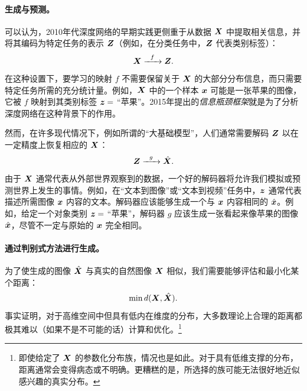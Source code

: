 \documentclass[../../book-main.tex]{subfiles}
\begin{document}
\paragraph{生成与预测。}
可以认为，2010年代深度网络的早期实践更侧重于从数据 $\bm{X}$ 中提取相关信息，并将其编码为特定任务的表示 $\bm{Z}$（例如，在分类任务中，$\bm{Z}$ 代表类别标签）：
\begin{equation}
    \bm{X}   \xrightarrow{\hspace{2mm} f \hspace{2mm}} \bm{Z}.
       \label{eqn:encoding-deep-networks}
\end{equation}
在这种设置下，要学习的映射 $f$ 不需要保留关于 $\bm{X}$ 的大部分分布信息，而只需要特定任务所需的充分统计量。例如，$\bm{X}$ 中的一个样本 $\bm{x}$ 可能是一张苹果的图像，它被 $f$ 映射到其类别标签 $\bm{z} =$ “苹果”。2015年提出的{\em 信息瓶颈框架}\cite{Tishby-ITW2015}就是为了分析深度网络在这种背景下的作用。
 
然而，在许多现代情况下，例如所谓的“大基础模型”，人们通常需要解码 $\bm{Z}$ 以在一定精度上恢复相应的 $\bm{X}$：
\begin{equation}
    \bm{Z}   \xrightarrow{\hspace{2mm} g  \hspace{2mm}} \hat {\bm{X}}.
       \label{eqn:decoding-deep-networks}
\end{equation}
由于 $\bm{X}$ 通常代表从外部世界观察到的数据，一个好的解码器将允许我们模拟或预测世界上发生的事情。例如，在“文本到图像”或“文本到视频”任务中，$\bm{z}$ 通常代表描述所需图像 $\bm{x}$ 内容的文本。解码器应该能够生成一个与 $\bm{x}$ 内容相同的 $\hat {\bm{x}}$。例如，给定一个对象类别 $\bm{z} = $ “苹果”，解码器 $g$ 应该生成一张看起来像苹果的图像 $\hat {\bm{x}}$，尽管不一定与原始的 $\bm{x}$ 完全相同。



\paragraph{通过判别式方法进行生成。}
为了使生成的图像 $\hat {\bm{X}}$ 与真实的自然图像 $\bm{X}$ 相似，我们需要能够评估和最小化某个距离：
\begin{equation}
    \min d(\bm{X}, \hat {\bm{X}}).
\end{equation}
事实证明，对于高维空间中但具有低内在维度的分布，大多数理论上合理的距离都极其难以（如果不是不可能的话）计算和优化。\footnote{即使给定了 $\bm{X}$ 的参数化分布族，情况也是如此。对于具有低维支撑的分布，距离通常会变得病态或不明确。更糟糕的是，所选择的族可能无法很好地近似感兴趣的真实分布。}
\end{document}
